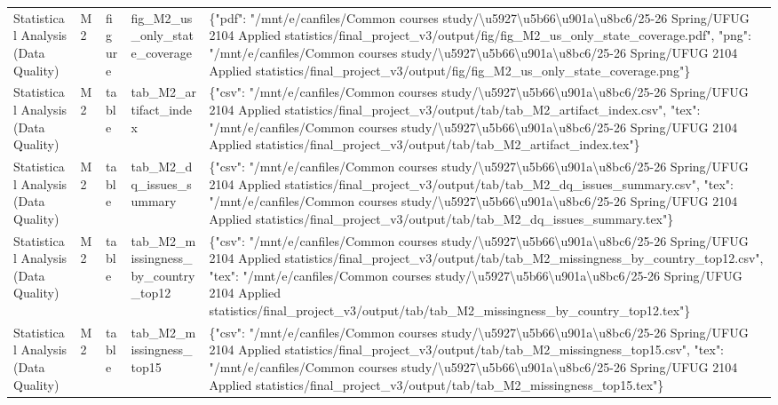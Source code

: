 \begin{tabular}{lllll}
Statistical Analysis (Data Quality) & M2 & figure & fig\_M2\_us\_only\_state\_coverage & \{"pdf": "/mnt/e/canfiles/Common courses study/\textbackslash u5927\textbackslash u5b66\textbackslash u901a\textbackslash u8bc6/25-26 Spring/UFUG 2104 Applied statistics/final\_project\_v3/output/fig/fig\_M2\_us\_only\_state\_coverage.pdf", "png": "/mnt/e/canfiles/Common courses study/\textbackslash u5927\textbackslash u5b66\textbackslash u901a\textbackslash u8bc6/25-26 Spring/UFUG 2104 Applied statistics/final\_project\_v3/output/fig/fig\_M2\_us\_only\_state\_coverage.png"\} \\
Statistical Analysis (Data Quality) & M2 & table & tab\_M2\_artifact\_index & \{"csv": "/mnt/e/canfiles/Common courses study/\textbackslash u5927\textbackslash u5b66\textbackslash u901a\textbackslash u8bc6/25-26 Spring/UFUG 2104 Applied statistics/final\_project\_v3/output/tab/tab\_M2\_artifact\_index.csv", "tex": "/mnt/e/canfiles/Common courses study/\textbackslash u5927\textbackslash u5b66\textbackslash u901a\textbackslash u8bc6/25-26 Spring/UFUG 2104 Applied statistics/final\_project\_v3/output/tab/tab\_M2\_artifact\_index.tex"\} \\
Statistical Analysis (Data Quality) & M2 & table & tab\_M2\_dq\_issues\_summary & \{"csv": "/mnt/e/canfiles/Common courses study/\textbackslash u5927\textbackslash u5b66\textbackslash u901a\textbackslash u8bc6/25-26 Spring/UFUG 2104 Applied statistics/final\_project\_v3/output/tab/tab\_M2\_dq\_issues\_summary.csv", "tex": "/mnt/e/canfiles/Common courses study/\textbackslash u5927\textbackslash u5b66\textbackslash u901a\textbackslash u8bc6/25-26 Spring/UFUG 2104 Applied statistics/final\_project\_v3/output/tab/tab\_M2\_dq\_issues\_summary.tex"\} \\
Statistical Analysis (Data Quality) & M2 & table & tab\_M2\_missingness\_by\_country\_top12 & \{"csv": "/mnt/e/canfiles/Common courses study/\textbackslash u5927\textbackslash u5b66\textbackslash u901a\textbackslash u8bc6/25-26 Spring/UFUG 2104 Applied statistics/final\_project\_v3/output/tab/tab\_M2\_missingness\_by\_country\_top12.csv", "tex": "/mnt/e/canfiles/Common courses study/\textbackslash u5927\textbackslash u5b66\textbackslash u901a\textbackslash u8bc6/25-26 Spring/UFUG 2104 Applied statistics/final\_project\_v3/output/tab/tab\_M2\_missingness\_by\_country\_top12.tex"\} \\
Statistical Analysis (Data Quality) & M2 & table & tab\_M2\_missingness\_top15 & \{"csv": "/mnt/e/canfiles/Common courses study/\textbackslash u5927\textbackslash u5b66\textbackslash u901a\textbackslash u8bc6/25-26 Spring/UFUG 2104 Applied statistics/final\_project\_v3/output/tab/tab\_M2\_missingness\_top15.csv", "tex": "/mnt/e/canfiles/Common courses study/\textbackslash u5927\textbackslash u5b66\textbackslash u901a\textbackslash u8bc6/25-26 Spring/UFUG 2104 Applied statistics/final\_project\_v3/output/tab/tab\_M2\_missingness\_top15.tex"\} \\

\end{tabular}

